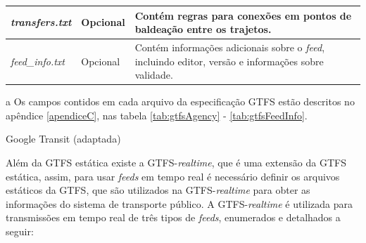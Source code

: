 \documentclass[
	12pt,				%
	oneside,			%
	a4paper,			%
	english,			%
	brazil				%
	]{abntex2ppgsi}
\begin{document}
\begin{table}[!htb]
\begin{threeparttable}
\begin{tabular}{>{\centering\arraybackslash}m{3.5cm} | >{\centering}m{3cm} | >{\centering\arraybackslash}m{8cm}}
\hline
\textit{transfers.txt }& Opcional & Contém regras para conexões em pontos de baldeação entre os trajetos. \\
\hline
\textit{feed\_info.txt} & Opcional & Contém informações adicionais sobre o \textit{feed}, incluindo editor, versão e informações sobre validade. \\
\hline
  \end{tabular}
  \begin{tablenotes}
            \item[a] Os campos contidos em cada arquivo da especificação GTFS estão descritos no apêndice \ref{apendiceC}, nas tabela \ref{tab:gtfsAgency} - \ref{tab:gtfsFeedInfo}.
        \end{tablenotes}
\end{threeparttable}
 Google Transit (adaptada)
\end{table}

Além da GTFS estática existe a GTFS-\textit{realtime}, que é uma extensão da GTFS estática, assim, para usar \textit{feeds} em tempo real é necessário definir os arquivos estáticos da GTFS, que são utilizados na GTFS-\textit{realtime} para obter as informações do sistema de transporte público. A GTFS-\textit{realtime} é utilizada para transmissões em tempo real de três tipos de \textit{feeds}, enumerados e detalhados a seguir:
\end{document}

